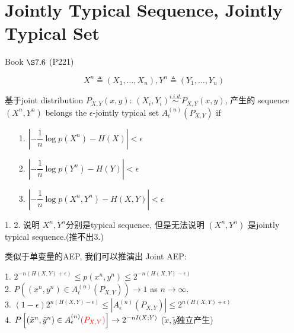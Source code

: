 \section{Jointly Typical Sequence, Jointly Typical Set}
\centerline{Book $\S 7.6$ (P221)}
$$X^n\triangleq \left(X_1,\ldots,X_n\right), Y^n\triangleq \left(Y_1,\ldots,Y_n\right)$$

\begin{definition}
基于joint distribution $P_{X,Y}(x,y)$: $(X_i,Y_i)\stackrel{i.i.d.}{\sim}P_{X,Y}(x,y)$, 产生的 sequence $(X^n,Y^n)$ belongs the $\epsilon$-jointly typical set $A_{\epsilon}^{(n)}(P_{X,Y})$ if
\begin{itemize}
\item[1.] $\left|-\dfrac{1}{n}\log p(X^n)-H(X)\right|<\epsilon$
\item[2.] $\left|-\dfrac{1}{n}\log p(Y^n)-H(Y)\right|<\epsilon$
\item[3.] $\left|-\dfrac{1}{n}\log p(X^n,Y^n)-H(X,Y)\right|<\epsilon$
\end{itemize}
\end{definition}
1. 2. 说明 $X^n,Y^n$分别是typical sequence, 但是无法说明 $(X^n,Y^n)$ 是jointly typical sequence.(推不出3.)

类似于单变量的AEP, 我们可以推演出 Joint AEP:
\begin{proposition}
1. $2^{-n\left(H(X,Y)+\epsilon\right)}\leq p(x^n,y^n)\leq 2^{-n\left(H(X,Y)-\epsilon\right)}$ \\
2. $P\left(\left(x^n,y^n\right)\in A_{\epsilon}^{(n)}(P_{X,Y})\right) \to 1$ as $n\to\infty$. \\
3. $(1-\epsilon)2^{n\left(H(X,Y)-\epsilon\right)}\leq |A_{\epsilon}^{(n)}(P_{X,Y})|\leq 2^{n\left(H(X,Y)+\epsilon\right)}$ \\
4. $P\left[(\tilde{x}^n,\tilde{y}^n)\in A_{\epsilon}^{(n)}\textcolor{red}{(P_{X,Y})}\right]\to 2^{-nI(X;Y)}$ \qquad($\tilde{x},\tilde{y}$独立产生)
\end{proposition}

